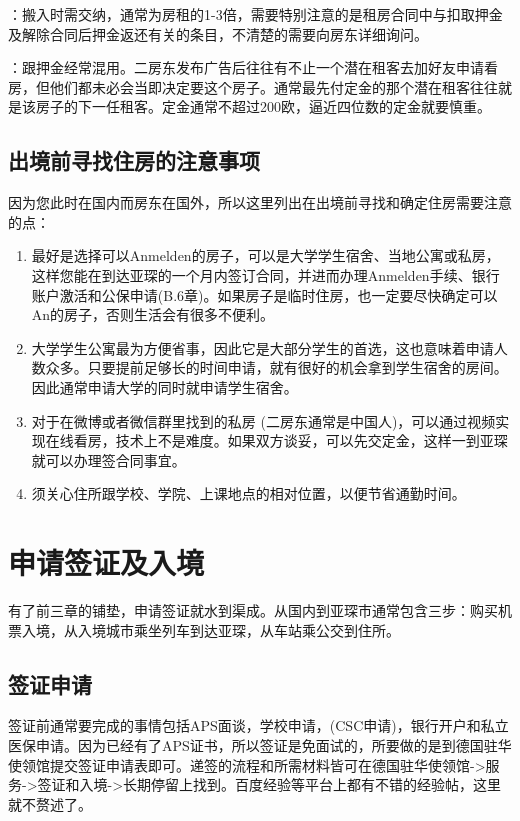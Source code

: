     ：搬入时需交纳，通常为房租的1-3倍，需要特别注意的是租房合同中与扣取押金及解除合同后押金返还有关的条目，不清楚的需要向房东详细询问。

    ：跟押金经常混用。二房东发布广告后往往有不止一个潜在租客去加好友申请看房，但他们都未必会当即决定要这个房子。通常最先付定金的那个潜在租客往往就是该房子的下一任租客。定金通常不超过200欧，逼近四位数的定金就要慎重。

  \subsection{出境前寻找住房的注意事项}

    因为您此时在国内而房东在国外，所以这里列出在出境前寻找和确定住房需要注意的点：

    \begin{enumerate}
      \item 最好是选择可以Anmelden的房子，可以是大学学生宿舍、当地公寓或私房，这样您能在到达亚琛的一个月内签订合同，并进而办理Anmelden手续、银行账户激活和公保申请(B.6章)。如果房子是临时住房，也一定要尽快确定可以An的房子，否则生活会有很多不便利。
      \item 大学学生公寓最为方便省事，因此它是大部分学生的首选，这也意味着申请人数众多。只要提前足够长的时间申请，就有很好的机会拿到学生宿舍的房间。因此通常申请大学的同时就申请学生宿舍。
      \item 对于在微博或者微信群里找到的私房 (二房东通常是中国人)，可以通过视频实现在线看房，技术上不是难度。如果双方谈妥，可以先交定金，这样一到亚琛就可以办理签合同事宜。
      \item 须关心住所跟学校、学院、上课地点的相对位置，以便节省通勤时间。
    \end{enumerate}


\section{申请签证及入境}

  有了前三章的铺垫，申请签证就水到渠成。从国内到亚琛市通常包含三步：购买机票入境，从入境城市乘坐列车到达亚琛，从车站乘公交到住所。

  \subsection{签证申请}

    签证前通常要完成的事情包括APS面谈，学校申请，(CSC申请)，银行开户和私立医保申请。因为已经有了APS证书，所以签证是免面试的，所要做的是到德国驻华使领馆提交签证申请表即可。递签的流程和所需材料皆可在德国驻华使领馆->服务->签证和入境->长期停留上找到。百度经验等平台上都有不错的经验帖，这里就不赘述了。

